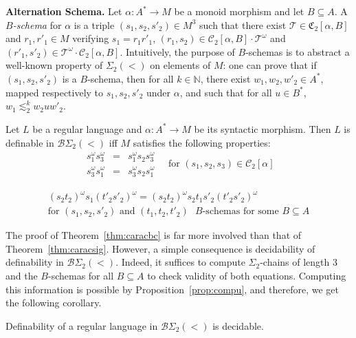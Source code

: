 \documentclass[envcountsame]{llncs}
\newcommand\nat{\ensuremath{\mathbb{N}}\xspace}
\newcommand\Cs{\ensuremath{\mathcal{C}}\xspace}
\newcommand\Cstwo{\ensuremath{\Cs_2}\xspace}
\newcommand\fCtwo{\ensuremath{\fC_2}\xspace}
\newcommand\Ts{\ensuremath{\mathcal{T}}\xspace}
\newcommand{\sic}[1]{\ensuremath{\Sigma_{#1}}\xspace}
\newcommand{\siwd}{\ensuremath{\Sigma_{2}(<)}\xspace}
\newcommand{\bswd}{\ensuremath{\mathcal{B}\Sigma_{2}(<)}\xspace}
\newcommand\sieq[2]{\ensuremath{\lesssim^{#1}_{#2}}\xspace}
\newcommand\ksieq[1]{\sieq{k}{#1}}
\newcommand\qchains[1]{\ensuremath{\sic{#1}}-chains\xspace}
\newcommand\dchains{\qchains{2}}
\newcommand\fC{\ensuremath{\mathfrak C}\xspace}
\begin{document}
\medskip
\noindent
{\bf Alternation Schema.} Let $\alpha: A^* \rightarrow M$ be a monoid
morphism and let $B \subseteq A$. A \emph{$B$-schema} for $\alpha$ is
a triple $(s_1,s_2,s'_2) \in M^3$ such that there exist $\Ts \in
\fCtwo[\alpha,B]$ and $r_1,r'_1 \in M$ verifying $s_1 = r_1r'_1$,
$(r_1,s_2) \in \Cstwo[\alpha,B] \cdot \Ts^\omega$ and $(r'_1,s'_2) \in
\Ts^\omega \cdot \Cstwo[\alpha,B]$. Intuitively, the purpose of
$B$-schemas is to abstract a well-known property of \siwd on elements of
$M$: one can prove that if $(s_1,s_2,s'_2)$ is a $B$-schema, then for
all $k \in \nat$, there exist $w_1,w_2,w'_2 \in A^*$, mapped respectively to $s_1,
s_2,s'_2$ under $\alpha$, and such that for all $u \in B^*$, $w_1 \ksieq{2}
w_2uw'_2$. 


\begin{theorem} \label{thm:caracbc}
  Let $L$ be a regular language and $\alpha: A^* \rightarrow M$ be its
  syntactic morphism. Then $L$ is definable in \bswd iff $M$ satisfies the
  following properties:
  \begin{equation}
    \begin{array}{rcl}
      s_1^{\omega}s_3^{\omega} & = & s_1^{\omega}s_2s_3^{\omega} \\
      s_3^{\omega}s_1^{\omega} & = & s_3^{\omega}s_2s_1^{\omega}
    \end{array} \quad \text{for $(s_1,s_2,s_3) \in \Cstwo[\alpha]$} \label{eq:bcs1}
  \end{equation}

  \begin{equation}
    \begin{array}{c}
      (s_2t_2)^{\omega}s_1(t'_2s'_2)^{\omega} = (s_2t_2)^{\omega}s_2t_1s'_2(t'_2s'_2)^{\omega} \\
      \text{for $(s_1,s_2,s'_2)$ and $(t_1,t_2,t'_2)$ $B$-schemas for some
        $B \subseteq A$}
    \end{array}\label{eq:bcs2}
  \end{equation}
\end{theorem}


The proof of Theorem~\ref{thm:caracbc} is far more involved than that
of Theorem~\ref{thm:caracsig}. However, a simple consequence is decidability of
definability in \bswd. Indeed, it suffices to compute \dchains of
length $3$ and the $B$-schemas for all $B \subseteq A$ to check validity of both
equations. Computing this information is possible by
Proposition~\ref{prop:compu}, and therefore, we get the following
corollary.

\begin{corollary} \label{cor:decid2} Definability of a regular language in
  \bswd is decidable.
\end{corollary}
\end{document}
